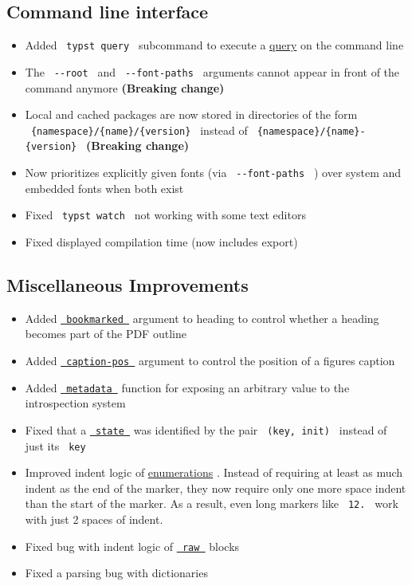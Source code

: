 \subsection{Command line interface}\label{command-line-interface}

\begin{itemize}
\tightlist
\item
  Added \texttt{\ typst\ query\ } subcommand to execute a
  \href{/docs/reference/introspection/query/\#command-line-queries}{query}
  on the command line
\item
  The \texttt{\ -\/-root\ } and \texttt{\ -\/-font-paths\ } arguments
  cannot appear in front of the command anymore \textbf{(Breaking
  change)}
\item
  Local and cached packages are now stored in directories of the form
  \texttt{\ \{namespace\}/\{name\}/\{version\}\ } instead of
  \texttt{\ \{namespace\}/\{name\}-\{version\}\ } \textbf{(Breaking
  change)}
\item
  Now prioritizes explicitly given fonts (via
  \texttt{\ -\/-font-paths\ } ) over system and embedded fonts when both
  exist
\item
  Fixed \texttt{\ typst\ watch\ } not working with some text editors
\item
  Fixed displayed compilation time (now includes export)
\end{itemize}

\subsection{Miscellaneous
Improvements}\label{miscellaneous-improvements}

\begin{itemize}
\tightlist
\item
  Added
  \href{/docs/reference/model/heading/\#parameters-bookmarked}{\texttt{\ bookmarked\ }}
  argument to heading to control whether a heading becomes part of the
  PDF outline
\item
  Added
  \href{/docs/reference/model/figure/\#definitions-caption-position}{\texttt{\ caption-pos\ }}
  argument to control the position of a figure\textquotesingle s caption
\item
  Added
  \href{/docs/reference/introspection/metadata/}{\texttt{\ metadata\ }}
  function for exposing an arbitrary value to the introspection system
\item
  Fixed that a
  \href{/docs/reference/introspection/state/}{\texttt{\ state\ }} was
  identified by the pair \texttt{\ (key,\ init)\ } instead of just its
  \texttt{\ key\ }
\item
  Improved indent logic of
  \href{/docs/reference/model/enum/}{enumerations} . Instead of
  requiring at least as much indent as the end of the marker, they now
  require only one more space indent than the start of the marker. As a
  result, even long markers like \texttt{\ 12.\ } work with just 2
  spaces of indent.
\item
  Fixed bug with indent logic of
  \href{/docs/reference/text/raw/}{\texttt{\ raw\ }} blocks
\item
  Fixed a parsing bug with dictionaries
\end{itemize}

